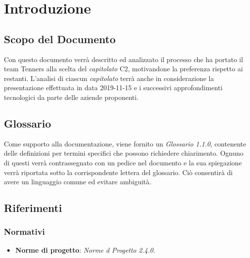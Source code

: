 \section{Introduzione}

\subsection{Scopo del Documento}
Con questo documento verrà descritto ed analizzato il processo che ha portato il team Tenners alla scelta del \textit{capitolato\glo} C2, motivandone la preferenza rispetto ai restanti. L'analisi di ciascun \textit{capitolato\glo} terrà anche in considerazione la presentazione effettuata in data 2019-11-15 e i successivi approfondimenti tecnologici da parte delle aziende proponenti.
	
\subsection{Glossario}
Come supporto alla documentazione, viene fornito un \textit{Glossario 1.1.0\docs}, contenente delle definizioni per termini specifici che possono richiedere chiarimento. Ognuno di questi verrà contrassegnato con un pedice \glo nel documento e la sua spiegazione verrà riportata sotto la corrispondente lettera del glossario. Ciò consentirà di avere un linguaggio comune ed evitare ambiguità. 
	
\subsection{Riferimenti}
\subsubsection{Normativi}
\begin{itemize}
	\item \textbf{Norme di progetto}: \textit{Norme d Progetto 2.4.0\docs}.
\end{itemize}

